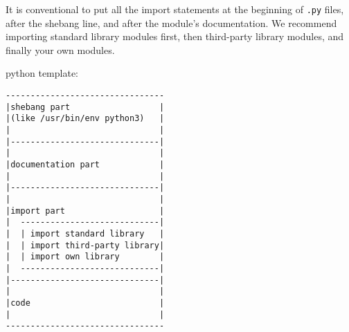 It is conventional to put all the import statements at the beginning of \verb|.py| files, after the shebang line, and after the module’s documentation.
We recommend importing standard library modules first, then third-party library modules, and finally your own modules.


\begin{tcolorbox}
python template:
\begin{verbatim}
--------------------------------
|shebang part                  |
|(like /usr/bin/env python3)   |
|                              |
|------------------------------|
|                              |
|documentation part            |
|                              |
|------------------------------|
|                              |
|import part                   |
|  ----------------------------|
|  | import standard library   |
|  | import third-party library|
|  | import own library        |
|  ----------------------------|
|------------------------------|
|                              |
|code                          |
|                              |
--------------------------------
\end{verbatim}
\end{tcolorbox}